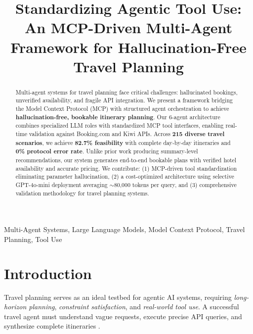 \documentclass[conference]{IEEEtran}
\begin{document}
\title{Standardizing Agentic Tool Use: An MCP-Driven Multi-Agent Framework for Hallucination-Free Travel Planning}

\author{
}

\maketitle

\begin{abstract}
Multi-agent systems for travel planning face critical challenges: hallucinated bookings, unverified availability, and fragile API integration. We present a framework bridging the Model Context Protocol (MCP) with structured agent orchestration to achieve \textbf{hallucination-free, bookable itinerary planning}. Our 6-agent architecture combines specialized LLM roles with standardized MCP tool interfaces, enabling real-time validation against Booking.com and Kiwi APIs. Across \textbf{215 diverse travel scenarios}, we achieve \textbf{82.7\% feasibility} with complete day-by-day itineraries and \textbf{0\% protocol error rate}. Unlike prior work producing summary-level recommendations, our system generates end-to-end bookable plans with verified hotel availability and accurate pricing. We contribute: (1) MCP-driven tool standardization eliminating parameter hallucination, (2) a cost-optimized architecture using selective GPT-4o-mini deployment averaging $\sim$80,000 tokens per query, and (3) comprehensive validation methodology for travel planning systems.
\end{abstract}

\begin{IEEEkeywords}
Multi-Agent Systems, Large Language Models, Model Context Protocol, Travel Planning, Tool Use
\end{IEEEkeywords}

\section{Introduction}

Travel planning serves as an ideal testbed for agentic AI systems, requiring \textit{long-horizon planning}, \textit{constraint satisfaction}, and \textit{real-world tool use}. A successful travel agent must understand vague requests, execute precise API queries, and synthesize complete itineraries \cite{dhote2025smart}.
\end{document}
